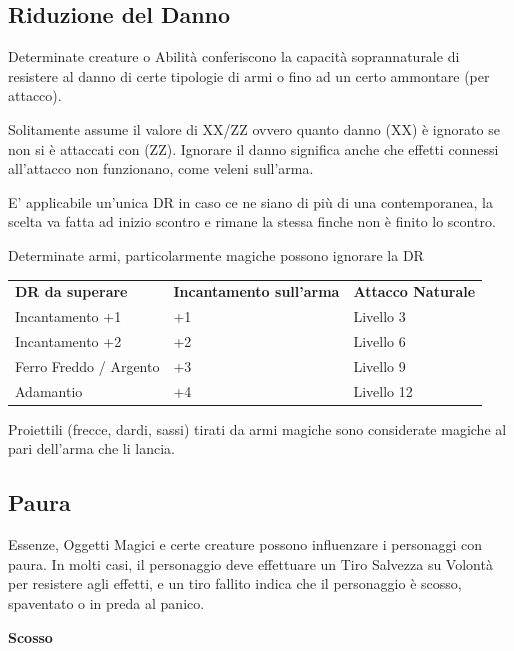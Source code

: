 \documentclass[a4paper,11pt,twoside,openany]{book}
\begin{document}
\subsection{Riduzione del Danno}

Determinate creature o Abilità conferiscono la capacità soprannaturale di resistere al danno di certe tipologie di armi o fino ad un certo ammontare (per attacco).

Solitamente assume il valore di XX/ZZ ovvero quanto danno (XX) è ignorato se non si è attaccati con (ZZ). Ignorare il danno significa anche che effetti connessi all'attacco non funzionano, come veleni sull'arma.

E' applicabile un'unica DR in caso ce ne siano di più di una contemporanea, la scelta va fatta ad inizio scontro e rimane la stessa finche non è finito lo scontro.

Determinate armi, particolarmente magiche possono ignorare la DR 

\bigskip

\begin{tabular}{lll}
	\toprule
	\textbf{DR da superare} & \textbf{Incantamento sull'arma} & \textbf{Attacco Naturale}\\
	Incantamento +1         & +1              & Livello 3\\
	Incantamento +2         & +2              & Livello 6\\
	Ferro Freddo / Argento  & +3              & Livello 9\\
	Adamantio               & +4              & Livello 12\\
\end{tabular}

Proiettili (frecce, dardi, sassi) tirati da armi magiche sono considerate
magiche al pari dell'arma che li lancia.



\subsection{Paura}

\label{paura}

Essenze, Oggetti Magici e certe creature possono influenzare i personaggi con paura. In molti casi, il personaggio deve effettuare un Tiro Salvezza su Volontà per resistere agli effetti, e un tiro fallito indica che il personaggio è scosso, spaventato o in preda al panico.

\textbf{Scosso}
\end{document}
